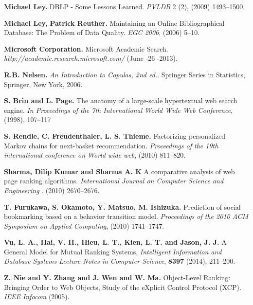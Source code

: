 \documentclass[10pt,leqno,twoside]{article}
\begin{document}
\begin{thebibliography}{99}
\textbf{Michael Ley.}
DBLP - Some Lessons Learned.
\textit{PVLDB} 2 (2), (2009) 1493--1500.



\textbf{Michael Ley, Patrick Reuther.}
Maintaining an Online Bibliographical Database: The Problem of Data Quality.
\textit{EGC 2006}, (2006) 5--10.




\textbf{Microsoft  Corporation.}
Microsoft Academic Search.
\textit{http://academic.research.microsoft.com/} (June -26 -2013).


\textbf{R.B. Nelsen.}
\textit{An Introduction to Copulas, 2nd ed.}.
Springer Series in Statistics, Springer, New York, 2006.


\textbf{S. Brin and L. Page.}
The anatomy of a large-scale hypertextual web search engine.
\textit{In Proceedings of the 7th International World Wide Web
Conference}, (1998), 107--117



\textbf{S. Rendle, C. Freudenthaler, L. S. Thieme.}
Factorizing personalized Markov chains for next-basket recommendation.
\textit{Proceedings of the 19th international conference on World wide web}, (2010) 811--820.

\textbf{Sharma, Dilip Kumar and Sharma A. K}
A comparative analysis of web page ranking algorithms.
\textit{International Journal on Computer Science and Engineering} . (2010) 2670--2676.

\textbf{T. Furukawa, S. Okamoto, Y. Matsuo, M. Ishizuka.}
Prediction of social bookmarking based on a behavior transition model.
\textit{Proceedings of the 2010 ACM Symposium on Applied Computing}, (2010) 1741--1747.

\textbf{Vu, L. A., Hai, V. H., Hieu, L. T., Kien, L. T.  and Jason, J. J. }
A General Model for Mutual Ranking Systems,
\textit{Intelligent Information and Database Systems
Lecture Notes in Computer Science}, \textbf{8397} (2014), 211--200.


\textbf{Z. Nie and Y. Zhang and J. Wen and W. Ma.}
Object-Level Ranking: Bringing Order to Web Objects,
Study of the eXplicit Control Protocol (XCP).
\textit{IEEE Infocom }(2005).


\end{thebibliography}
\vspace{2cm}
\end{document}
